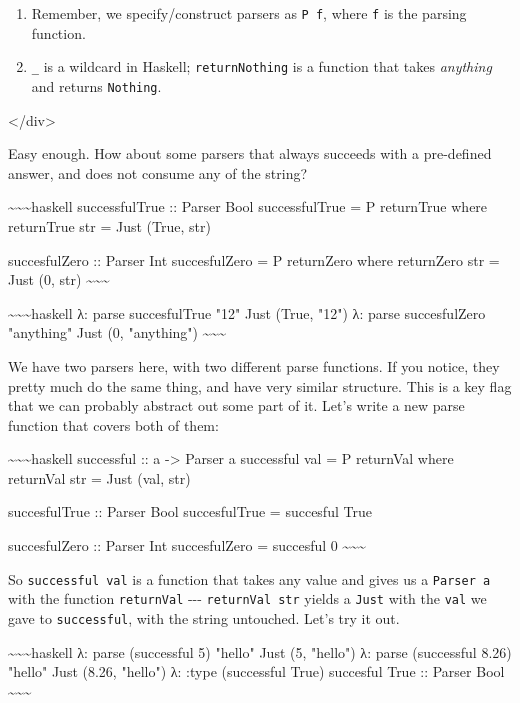 \documentclass[]{article}
\begin{document}
\begin{enumerate}
\tightlist
\item
  Remember, we specify/construct parsers as \texttt{P\ f}, where \texttt{f} is
  the parsing function.
\item
  \texttt{\_} is a wildcard in Haskell; \texttt{returnNothing} is a function
  that takes \emph{anything} and returns \texttt{Nothing}.
\end{enumerate}

\textless{}/div\textgreater{}

Easy enough. How about some parsers that always succeeds with a pre-defined
answer, and does not consume any of the string?

\textasciitilde{}\textasciitilde{}\textasciitilde{}haskell successfulTrue ::
Parser Bool successfulTrue = P returnTrue where returnTrue str = Just (True,
str)

succesfulZero :: Parser Int succesfulZero = P returnZero where returnZero str =
Just (0, str) \textasciitilde{}\textasciitilde{}\textasciitilde{}

\textasciitilde{}\textasciitilde{}\textasciitilde{}haskell λ: parse
succesfulTrue "12" Just (True, "12") λ: parse succesfulZero "anything" Just (0,
"anything") \textasciitilde{}\textasciitilde{}\textasciitilde{}

We have two parsers here, with two different parse functions. If you notice,
they pretty much do the same thing, and have very similar structure. This is a
key flag that we can probably abstract out some part of it. Let's write a new
parse function that covers both of them:

\textasciitilde{}\textasciitilde{}\textasciitilde{}haskell successful :: a
-\textgreater{} Parser a successful val = P returnVal where returnVal str = Just
(val, str)

succesfulTrue :: Parser Bool succesfulTrue = succesful True

succesfulZero :: Parser Int succesfulZero = succesful 0
\textasciitilde{}\textasciitilde{}\textasciitilde{}

So \texttt{successful\ val} is a function that takes any value and gives us a
\texttt{Parser\ a} with the function \texttt{returnVal} -\/-\/-
\texttt{returnVal\ str} yields a \texttt{Just} with the \texttt{val} we gave to
\texttt{successful}, with the string untouched. Let's try it out.

\textasciitilde{}\textasciitilde{}\textasciitilde{}haskell λ: parse (successful
5) "hello" Just (5, "hello") λ: parse (successful 8.26) "hello" Just (8.26,
"hello") λ: :type (successful True) succesful True :: Parser Bool
\textasciitilde{}\textasciitilde{}\textasciitilde{}
\end{document}

